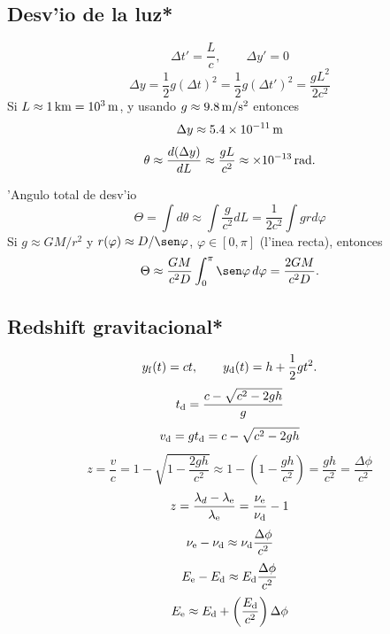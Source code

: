 \subsection{Desv'io de la luz*}
\begin{equation}
\Delta t'=\frac{L}{c}, \qquad \Delta y' = 0
\end{equation}
\begin{equation}
\Delta y = \frac{1}{2} g (\Delta t)^2 = \frac{1}{2} g (\Delta t')^2 = \frac{gL^2}{2c^2}
\end{equation}
Si $L\approx 1{\,\rm km} = 10^3{\,\rm m}$, y usando $g\approx 9.8{\,\rm m/s^2}$ entonces
\begin{equation}
\Delta y \approx 5.4\times 10^{-11}{\,\rm m}
\end{equation}
\begin{equation}
\theta \approx \frac{d(\Delta y)}{dL} \approx \frac{gL}{c^2} \approx \times 10^{-13}{\,\rm rad}.
\end{equation}

'Angulo total de desv'io
\begin{equation}
\Theta = \int d\theta \approx \int \frac{g}{c^2}dL = \frac{1}{2c^2}\int g r d\varphi
\end{equation}
Si $g\approx GM/r^2$ y $r(\varphi)\approx D/\sen\varphi$, $\varphi\in [0,\pi]$ (l'inea recta), entonces
\begin{equation}
\Theta \approx \frac{GM}{c^2D}\int_0^\pi\sen\varphi\,d\varphi = \frac{2GM}{c^2D}.
\end{equation}

\subsection{Redshift gravitacional*}
 
 \begin{equation}
 y_{\rm f}(t) = ct, \qquad y_{\rm d}(t)=h+\frac{1}{2}gt^2.
 \end{equation}
 \begin{equation}
t_{\rm d} = \frac{c-\sqrt{c^2-2gh}}{g}
 \end{equation}
 \begin{equation}
 v_{\rm d}=gt_{\rm d} = c-\sqrt{c^2-2gh}
 \end{equation}
 \begin{equation}
 z=\frac{v}{c}=1-\sqrt{1-\frac{2gh}{c^2}} \approx 1-\left(1-\frac{gh}{c^2}\right) = \frac{gh}{c^2} = \frac{\Delta\phi}{c^2}
 \end{equation}
 \begin{equation}
z = \frac{\lambda_{d}-\lambda_{\rm e}}{\lambda_{\rm e}} = \frac{\nu_{\rm e}}{\nu_{\rm d}}-1
 \end{equation}
 \begin{equation}
 \nu_{\rm e}-\nu_{\rm d} \approx \nu_{\rm d}\frac{\Delta\phi}{c^2}
 \end{equation}
  \begin{equation}
 E_{\rm e}-E_{\rm d} \approx E_{\rm d}\frac{\Delta\phi}{c^2}
 \end{equation}
   \begin{equation}
 E_{\rm e} \approx E_{\rm d} + \left(\frac{E_{\rm d}}{c^2}\right)\Delta\phi
 \end{equation}
